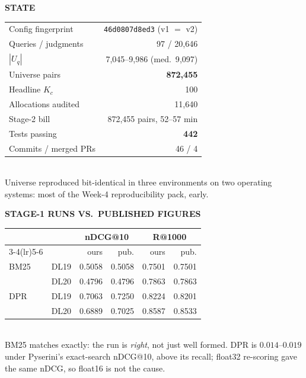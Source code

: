 \documentclass[10pt,a4paper]{article}
\newcommand{\Uq}{U_q}
\newcommand{\Kc}{K_c}
\begin{document}
\vspace{3pt}
\begin{minipage}[t]{0.495\textwidth}
\textbf{\footnotesize STATE}\\[2pt]
{\footnotesize
\begin{tabular}{@{}lr@{}}
\toprule
Config fingerprint & \texttt{46d0807d8ed3} (v1 $=$ v2) \\
Queries / judgments & 97 / 20{,}646 \\
$|\Uq|$ & 7{,}045--9{,}986 (med.\ 9{,}097) \\
Universe pairs & \textbf{872{,}455} \\
Headline $\Kc$ & 100 \\
Allocations audited & 11{,}640 \\
Stage-2 bill & 872{,}455 pairs, 52--57 min \\
Tests passing & \textbf{442} \\
Commits / merged PRs & 46 / 4 \\
\bottomrule
\end{tabular}}\\[3pt]
{\footnotesize Universe reproduced bit-identical in three environments on two
operating systems: most of the Week-4 reproducibility pack, early.}
\end{minipage}\hfill
\begin{minipage}[t]{0.495\textwidth}
\textbf{\footnotesize STAGE-1 RUNS VS.\ PUBLISHED FIGURES}\\[2pt]
{\footnotesize
\begin{tabular}{@{}llrrrr@{}}
\toprule
& & \multicolumn{2}{c}{nDCG@10} & \multicolumn{2}{c}{R@1000} \\
\cmidrule(lr){3-4}\cmidrule(lr){5-6}
& & ours & pub. & ours & pub. \\
\midrule
BM25 & DL19 & 0.5058 & 0.5058 & 0.7501 & 0.7501 \\
     & DL20 & 0.4796 & 0.4796 & 0.7863 & 0.7863 \\
DPR  & DL19 & 0.7063 & 0.7250 & 0.8224 & 0.8201 \\
     & DL20 & 0.6889 & 0.7025 & 0.8587 & 0.8533 \\
\bottomrule
\end{tabular}}\\[3pt]
{\footnotesize BM25 matches exactly: the run is \emph{right}, not just well
formed. DPR is $0.014$--$0.019$ under Pyserini's exact-search nDCG@10, above its
recall; float32 re-scoring gave the same nDCG, so float16 is not the cause.}
\end{minipage}
\end{document}
